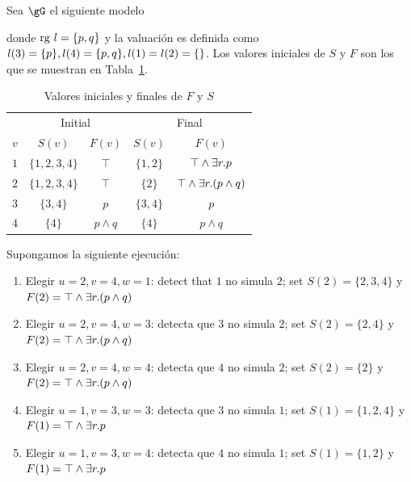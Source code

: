 \begin{ex}
Sea $\gG$ el siguiente modelo
\begin{center}
\end{center}
%
donde ${\rm rg}\ l=\{p,q\}$ y la valuaci\'on es definida como
$l(3)=\{p\}, l(4)=\{p,q\}, l(1)=l(2)=\{\}$. Los valores iniciales de $S$ y $F$ son los que se muestran en
Tabla~\ref{tab:example}.

\begin{table}[ht]
\centering
{\footnotesize
\begin{tabular}{|c|c|c|c|c|}
\hline
&\multicolumn{2}{|c|}{Initial}&\multicolumn{2}{|c|}{Final}\\
$v$ & $S(v)$ & $F(v)$ & $S(v)$&$F(v)$\\
\hline
$1$ & $\{1,2,3,4\}$ & $\top$ & $\{1,2\}$&$\top\wedge\exists r. p$\\
$2$ & $\{1,2,3,4\}$ & $\top$ & $\{2\}$&$\top\wedge\exists r.(p\wedge q)$\\
$3$ & $\{3,4\}$ & $p$ & $\{3,4\}$ &$p$\\
$4$ & $\{4\}$ & $p\wedge q$ & $\{4\}$&$p\wedge q$\\
\hline
\end{tabular}
\caption{Valores iniciales y finales de $F$ y $S$}\label{tab:example}
}
\end{table}

Supongamos la siguiente ejecuci\'on:
\begin{enumerate}
\item Elegir $u=2,v=4,w=1$: detect that $1$ no simula $2$; set $S(2)=\{2,3,4\}$ y $F(2)=\top\wedge\exists r.(p\wedge q)$
\item Elegir $u=2,v=4,w=3$: detecta que $3$ no simula $2$; set $S(2)=\{2,4\}$ y $F(2)=\top\wedge\exists r.(p\wedge q)$
\item Elegir $u=2,v=4,w=4$: detecta que $4$ no simula $2$; set $S(2)=\{2\}$ y $F(2)=\top\wedge\exists r.(p\wedge q)$
\item Elegir $u=1,v=3,w=3$: detecta que $3$ no simula $1$; set $S(1)=\{1,2,4\}$ y $F(1)=\top\wedge\exists r. p$
\item Elegir $u=1,v=3,w=4$: detecta que $4$ no simula $1$; set $S(1)=\{1,2\}$ y $F(1)=\top\wedge\exists r. p$
\end{enumerate}


\end{ex}
